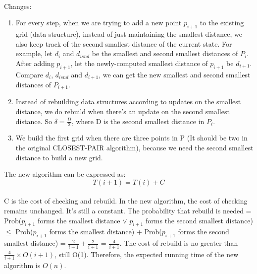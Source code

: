 \begin{problem}{5} ~\\
Changes:
\begin{enumerate}
\item For every step, when we are trying to add a new point $p_{i+1}$ to the existing grid (data structure), instead of just maintaining the smallest distance, we also keep track of the second smallest distance of the current state. For example, let $d_i$ and $d_{i snd}$ be the smallest and second smallest distances of $P_i$. After adding $p_{i+1}$, let the newly-computed smallest distance of $p_{i+1}$ be $d_{i+1}$. Compare $d_i$, $d_{i snd}$ and $d_{i+1}$, we can get the new smallest and second smallest distances of $P_{i+1}$.
\item Instead of rebuilding data structures according to updates on the smallest distance, we do rebuild when there's an update on the second smallest distance. So $\delta = \frac{D}{2}$, where D is the second smallest distance in $P_i$.
\item We build the first grid when there are three points in P (It should be two in the original CLOSEST-PAIR algorithm), because we need the second smallest distance to build a new grid.
\end{enumerate}
The new algorithm can be expressed as:
$$T(i+1) = T(i) + C$$\\
C is the cost of checking and rebuild. In the new algorithm, the cost of checking remains unchanged. It's still a constant. The probability that rebuild is needed = Prob($p_{i+1}$ forms the smallest distance $\vee$ $p_{i+1}$ forms the second smallest distance) $\leq$ Prob($p_{i+1}$ forms the smallest distance) + Prob($p_{i+1}$ forms the second smallest distance) = $\frac{2}{i+1} + \frac{2}{i+1}$ = $\frac{4}{i+1}$. The cost of rebuild is no greater than $\frac{4}{i+1} \times O(i+1)$, still O(1). Therefore, the expected running time of the new algorithm is $O(n)$.
\end{problem}